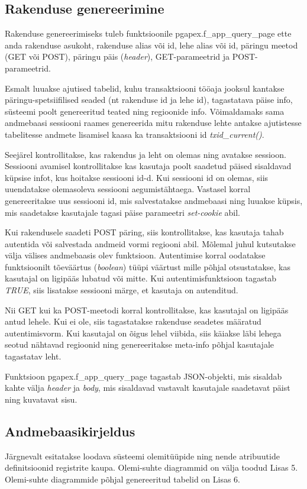 \documentclass[a4paper,12pt]{article} %
\begin{document}
\subsection{Rakenduse genereerimine}
Rakenduse genereerimiseks tuleb  funktsioonile pgapex.f\_app\_query\_page ette anda rakenduse asukoht, rakenduse alias või id, lehe alias või id, päringu meetod (GET või POST), päringu päis (\textit{header}), GET-parameetrid ja POST-parameetrid.\par
Esmalt luuakse ajutised tabelid, kuhu transaktsiooni tööaja jooksul kantakse päringu-spetsiifilised seaded (nt rakenduse id ja lehe id), tagastatava päise info, süsteemi poolt genereeritud teated ning regioonide info.
Võimaldamaks sama andmebaasi sessiooni raames genereerida mitu rakenduse lehte antakse ajutistesse tabelitesse andmete lisamisel kaasa ka transaktsiooni id \textit{txid\_current()}.\par
Seejärel kontrollitakse, kas rakendus ja leht on olemas ning avatakse sessioon.
Sessiooni avamisel kontrollitakse kas kasutaja poolt saadetud päised sisaldavad küpsise infot, kus hoitakse sessiooni id-d. Kui sessiooni id on olemas, siis uuendatakse olemasoleva sessiooni aegumistähtaega. Vastasel korral genereeritakse uus sessiooni id, mis salvestatakse andmebaasi ning luuakse küpsis, mis saadetakse kasutajale tagasi päise parameetri \textit{set-cookie} abil.\par
Kui rakendusele saadeti POST päring, siis kontrollitakse, kas kasutaja tahab autentida või salvestada andmeid vormi regiooni abil. Mõlemal juhul kutsutakse välja välises andmebaasis olev funktsioon. Autentimise korral oodatakse funktsioonilt tõeväärtus (\textit{boolean}) tüüpi väärtust mille põhjal otsustatakse, kas kasutajal on ligipääs lubatud või mitte. Kui autentimisfunktsioon tagastab \textit{TRUE}, siis lisatakse sessiooni märge, et kasutaja on autenditud.\par
Nii GET kui ka POST-meetodi korral kontrollitakse, kas kasutajal on ligipääs antud lehele. Kui ei ole, siis tagastatakse rakenduse seadetes määratud autentimisvorm. Kui kasutajal on õigus lehel viibida, siis käiakse läbi lehega seotud nähtavad regioonid ning genereeritakse meta-info põhjal kasutajale tagastatav leht.\par
Funktsioon pgapex.f\_app\_query\_page tagastab JSON-objekti, mis sisaldab kahte välja \textit{header} ja \textit{body}, mis sisaldavad vastavalt kasutajale saadetavat päist ning kuvatavat sisu.

\subsection{Andmebaasikirjeldus}
Järgnevalt esitatakse loodava süsteemi olemitüüpide ning nende atribuutide definitsioonid registrite kaupa. Olemi-suhte diagrammid  on välja toodud Lisas 5. Olemi-suhte diagrammide põhjal genereeritud tabelid on Lisas 6.
\end{document}

